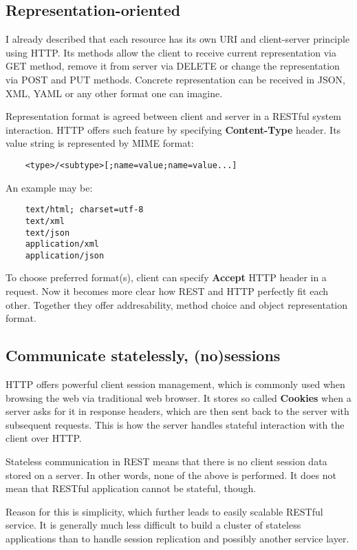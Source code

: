 	\subsection{Representation-oriented}
	
	I already described that each resource has its own URI and client-server principle using HTTP. Its methods allow the
	client to receive current representation via GET method, remove it from server via DELETE or change the representation
	via POST and PUT methods. Concrete representation can be received in JSON, XML, YAML or any other format one can
	imagine.
	
	Representation format is agreed between client and server in a RESTful system interaction. HTTP offers such feature
	by specifying \textbf{Content-Type} header. Its value string is represented by \gls{MIME} format:
	
	\begin{verbatim}
	<type>/<subtype>[;name=value;name=value...]
	\end{verbatim}
	
	An example may be:
	
	\begin{verbatim}
	text/html; charset=utf-8
	text/xml
	text/json
	application/xml
	application/json
	\end{verbatim}
	
	To choose preferred format(s), client can specify \textbf{Accept} HTTP header in a request. Now it becomes more clear
	how REST and HTTP perfectly fit each other. Together they offer addresability, method choice and object representation
	format.
	
	\subsection{Communicate statelessly, (no)sessions}
	
	HTTP offers powerful client session management, which is commonly used when browsing the web via traditional web
	browser. It stores so called \textbf{Cookies} when a server asks for it in response headers, which are then sent back
	to the server with subsequent requests. This is how the server handles stateful interaction with the client over HTTP.
	
	Stateless communication in REST means that there is no client session data stored on a server. In other words, none of
	the above is performed. It does not mean that RESTful application cannot be stateful, though.
	
	Reason for this is simplicity, which further leads to easily scalable RESTful service. It is generally much less
	difficult to build a cluster of stateless applications than to handle session replication and possibly another service
	layer.
	
